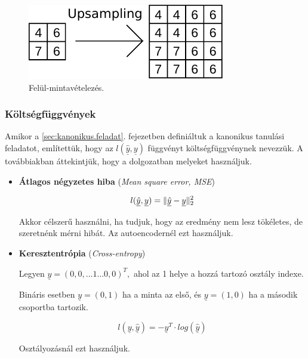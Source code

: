 \begin{figure} [h!]
	\centering
	\includegraphics[scale=1.2]{img/upsamping-pelda.pdf}
	\caption{Felül-mintavételezés.}
	\label{fig:upsampling-pelda}
\end{figure}




\subsubsection{Költségfüggvények}

Amikor a \ref{sec:kanonikus.feladat}. fejezetben definiáltuk a kanonikus tanulási feladatot, említettük, hogy az $ l(\underline{\hat{y}}, \underline{y}) $ függvényt költségfüggvénynek nevezzük. A továbbiakban áttekintjük, hogy a dolgozatban melyeket használjuk.

%

\begin{itemize}
	
	\item 
	\textbf{Átlagos négyzetes hiba} (\textit{Mean square error, MSE})
	
	
	\[  l(\underline{\hat{y}}, \underline{y}) = \lVert\underline{\hat{y}} - \underline{y}\rVert_2^2  \]
	
	\noindent
	Akkor célszerű használni, ha tudjuk, hogy az eredmény nem lesz tökéletes, de szeretnénk mérni hibát. Az autoencodernél ezt használjuk.
	
	\item 
	\textbf{Keresztentrópia} (\textit{Cross-entropy})
	
	Legyen $ \underline{y} = (0, 0, \dots 1 \dots 0, 0)^T, $ 
	ahol az 1 helye a hozzá tartozó osztály indexe.
	
	Bináris esetben $ \underline{y}=(0, 1) $ ha a minta az első, és
	$ \underline{y}=(1, 0) $ ha a második csoportba tartozik.
	
	\[  l(\underline{y}, \underline{\hat{y}}) = - \underline{y}^T \cdot log(\underline{\hat{y}})  \]
	
	\noindent
	Osztályozásnál ezt használjuk.
	
	
\end{itemize}

